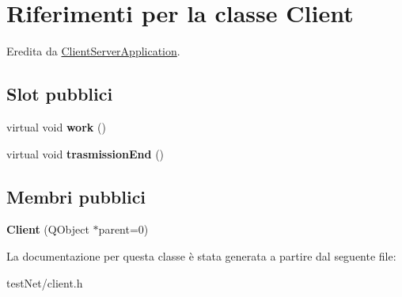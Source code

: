 \hypertarget{class_client}{\section{Riferimenti per la classe Client}
\label{class_client}
}


Eredita da \hyperlink{class_client_server_application}{Client\-Server\-Application}.

\subsection*{Slot pubblici}
\begin{DoxyCompactItemize}
\item 
\hypertarget{class_client_a8550e4e47247c8c542d11a19b80f957f}{virtual void {\bfseries work} ()}\label{class_client_a8550e4e47247c8c542d11a19b80f957f}

\item 
\hypertarget{class_client_ad0e898efd843e9e6570be84e42c1bdeb}{virtual void {\bfseries trasmission\-End} ()}\label{class_client_ad0e898efd843e9e6570be84e42c1bdeb}

\end{DoxyCompactItemize}
\subsection*{Membri pubblici}
\begin{DoxyCompactItemize}
\item 
\hypertarget{class_client_a7832757f3fa37f564a21cb2b79b2baad}{{\bfseries Client} (Q\-Object $\ast$parent=0)}\label{class_client_a7832757f3fa37f564a21cb2b79b2baad}

\end{DoxyCompactItemize}


La documentazione per questa classe è stata generata a partire dal seguente file\-:\begin{DoxyCompactItemize}
\item 
test\-Net/client.\-h\end{DoxyCompactItemize}
